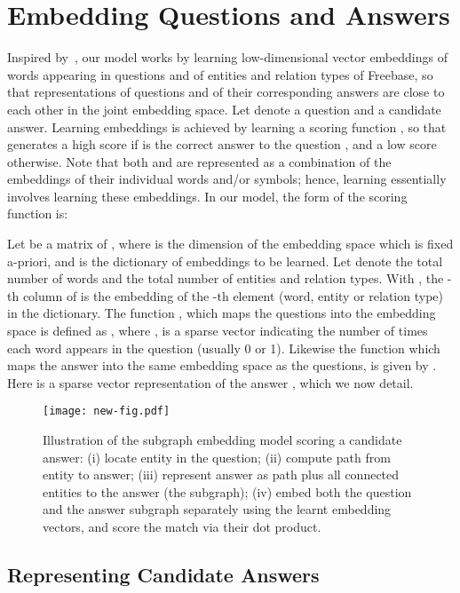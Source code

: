 \documentclass[runningheads,a4paper]{llncs}
\newcommand{\fb}{{\sc Freebase}\xspace}
\begin{document}
\section{Embedding Questions and Answers} \label{model} 


Inspired
by~\cite{bordes2014open}, our model works by learning low-dimensional
vector embeddings of words appearing in questions and of
entities and relation types of \fb, so that representations of 
questions and of their corresponding answers are close to each other
in the joint embedding space. 
Let  denote a question and  a candidate answer.  
Learning embeddings is achieved by learning a scoring function ,  
so that  generates a high score if  is the correct 
answer to the question , and a low score otherwise. Note that both  and  
are represented as a combination of the embeddings of their individual words and/or 
symbols; hence, learning  essentially involves learning these 
embeddings. In our model, the form of the scoring function is: 

Let  be a matrix of , 
where  is the dimension of the embedding space which is fixed a-priori,
and  is the dictionary of embeddings to be learned.
Let  denote the total number of words
and  the total number of entities and relation types.
With , the
 -th column of  is the embedding of the -th 
element (word, entity or relation type) in the dictionary. 
The function , which maps the questions into the embedding 
space  is defined as , where 
, is a sparse vector indicating the 
number of times each word appears in the question  (usually 0 or 1). 
Likewise the function  which maps the answer 
into the same embedding space  as the questions, 
is given by . 
Here  is a sparse vector representation 
of the answer , which we now detail. 

\begin{figure*}
\begin{center}
\texttt{[image: new-fig.pdf]}
\caption{\label{fig:subgraph} Illustration of the subgraph embedding
  model scoring a candidate answer: (i) locate entity in the question;
  (ii) compute path from entity to answer; (iii) represent answer as
  path plus all connected entities to the answer (the subgraph); (iv)
  embed both the question and the answer subgraph separately using the
  learnt embedding vectors, and score the match via their dot
  product.}
\end{center}
\end{figure*}

\subsection{Representing Candidate Answers} \label{ans-features}
\end{document}
